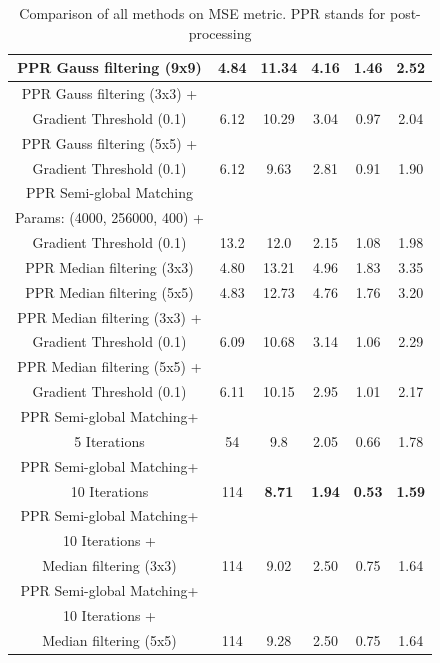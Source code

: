 \documentclass  [
  paper    = a4,
  BCOR     = 10mm,
  twoside,
  fontsize = 12pt,
  fleqn,
  toc      = bibnumbered,
  toc      = listofnumbered,
  numbers  = noendperiod,
  headings = normal,
  listof   = leveldown,
  version  = 3.03
]                                       {scrreprt}
\begin{document}
\begin{table}
\begin{tabular}{|c|c|c|c|c|c|}
		\hline
		PPR Gauss filtering (9x9) & 4.84& 11.34 & 4.16 & 1.46 & 2.52 \\
		\hline
		PPR Gauss filtering (3x3) +&&&&&\\
		 Gradient Threshold (0.1) & 6.12 & 10.29 & 3.04 & 0.97 &2.04\\
		\hline
		PPR Gauss filtering (5x5) +&&&&&\\
		Gradient Threshold (0.1) & 6.12 & 9.63 & 2.81 & 0.91 & 1.90\\
		\hline
		PPR Semi-global Matching&&&&&\\
		Params: (4000, 256000, 400) +&&&&&\\
		Gradient Threshold (0.1) & 13.2 &12.0 & 2.15 & 1.08 & 1.98\\
		\hline
		PPR Median filtering (3x3) & 4.80 & 13.21 & 4.96 & 1.83 & 3.35 \\
		\hline
		PPR Median filtering (5x5) & 4.83 & 12.73 & 4.76 & 1.76 & 3.20 \\
		\hline
		PPR Median filtering (3x3) +&&&&&\\
		Gradient Threshold (0.1) &6.09 & 10.68 & 3.14 & 1.06 & 2.29 \\
		\hline 
		PPR Median filtering (5x5) +&&&&&\\
		Gradient Threshold (0.1)  & 6.11& 10.15 & 2.95 & 1.01 &2.17 \\
		\hline
		PPR Semi-global Matching+&&&&&\\
		5 Iterations & 54 & 9.8  & 2.05 & 0.66 & 1.78  \\
		\hline
		PPR Semi-global Matching+&&&&&\\
		10 Iterations  & 114 & \textbf{8.71} & \textbf{1.94} & \textbf{0.53} & \textbf{1.59} \\
		\hline
		PPR Semi-global Matching+&&&&&\\
		10 Iterations +&&&&&\\
		 Median filtering (3x3) & 114 & 9.02 & 2.50 & 0.75 & 1.64 \\
		\hline
		PPR Semi-global Matching+&&&&&\\
		10 Iterations +&&&&&\\
		Median filtering (5x5) & 114 & 9.28 & 2.50 & 0.75 & 1.64 \\
		\hline
	\end{tabular}
\caption[Resumee Table]{Comparison of all methods on MSE metric. PPR stands for post-processing} 
\label{tab:comparison}
\end{table}
\end{document}
